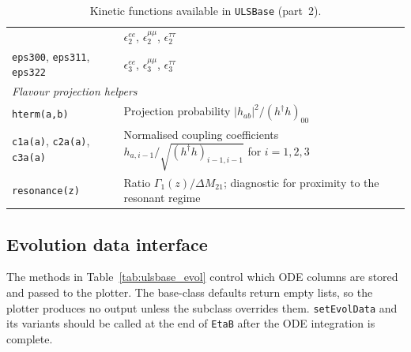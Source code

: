 \documentclass[12pt, a4paper]{article}
\begin{document}
\begin{table}[H]
\begin{tabular}{p{5.2cm} p{8.8cm}}
  & $\epsilon_2^{ee}$,\; $\epsilon_2^{\mu\mu}$,\; $\epsilon_2^{\tau\tau}$ \\
\texttt{eps300}, \texttt{eps311}, \texttt{eps322}
  & $\epsilon_3^{ee}$,\; $\epsilon_3^{\mu\mu}$,\; $\epsilon_3^{\tau\tau}$ \\
\hline
\multicolumn{2}{l}{\textit{Flavour projection helpers}} \\
\texttt{hterm(a,b)}
  & Projection probability $|h_{ab}|^2/(h^\dagger h)_{00}$ \\
\texttt{c1a(a)}, \texttt{c2a(a)}, \texttt{c3a(a)}
  & Normalised coupling coefficients
    $h_{a,i-1}/\sqrt{(h^\dagger h)_{i-1,i-1}}$ for $i=1,2,3$ \\
\texttt{resonance(z)}
  & Ratio $\Gamma_1(z)/\Delta M_{21}$;
    diagnostic for proximity to the resonant regime \\
\hline
\end{tabular}
\caption{Kinetic functions available in \texttt{ULSBase} (part~2).}
\label{tab:ulsbase_kinetic2}
\end{table}

\subsection*{Evolution data interface}

The methods in Table~\ref{tab:ulsbase_evol} control which ODE columns are stored and passed to
the plotter. The base-class defaults return empty lists, so the plotter produces no output unless
the subclass overrides them. \texttt{setEvolData} and its variants should be called at the end of
\texttt{EtaB} after the ODE integration is complete.
\end{document}
